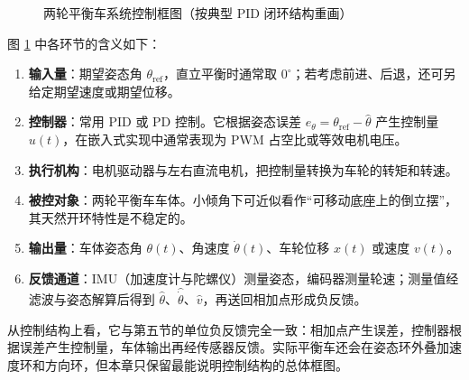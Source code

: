 \documentclass[12pt]{ctexart}
\providecommand{\tightlist}{\setlength{\itemsep}{0pt}\setlength{\parskip}{0pt}}
\begin{document}
\begin{figure}[H]
{}
\caption{两轮平衡车系统控制框图（按典型 PID 闭环结构重画）}
\label{fig:balance-car-control}
\end{figure}

图 \ref{fig:balance-car-control} 中各环节的含义如下：

\begin{enumerate}
\def\labelenumi{\arabic{enumi}.}
\tightlist
\item
  \textbf{输入量}：期望姿态角
  \(\theta_{\mathrm{ref}}\)，直立平衡时通常取
  \(0^\circ\)；若考虑前进、后退，还可另给定期望速度或期望位移。
\item
  \textbf{控制器}：常用 PID 或 PD 控制。它根据姿态误差
  \(e_\theta=\theta_{\mathrm{ref}}-\hat\theta\) 产生控制量
  \(u(t)\)，在嵌入式实现中通常表现为 PWM 占空比或等效电机电压。
\item
  \textbf{执行机构}：电机驱动器与左右直流电机，把控制量转换为车轮的转矩和转速。
\item
  \textbf{被控对象}：两轮平衡车车体。小倾角下可近似看作``可移动底座上的倒立摆''，其天然开环特性是不稳定的。
\item
  \textbf{输出量}：车体姿态角 \(\theta(t)\)、角速度
  \(\dot\theta(t)\)、车轮位移 \(x(t)\) 或速度 \(v(t)\)。
\item
  \textbf{反馈通道}：IMU（加速度计与陀螺仪）测量姿态，编码器测量轮速；测量值经滤波与姿态解算后得到
  \(\hat\theta\)、\(\hat{\dot\theta}\)、\(\hat v\)，再送回相加点形成负反馈。
\end{enumerate}

从控制结构上看，它与第五节的单位负反馈完全一致：相加点产生误差，控制器根据误差产生控制量，车体输出再经传感器反馈。实际平衡车还会在姿态环外叠加速度环和方向环，但本章只保留最能说明控制结构的总体框图。
\end{document}
